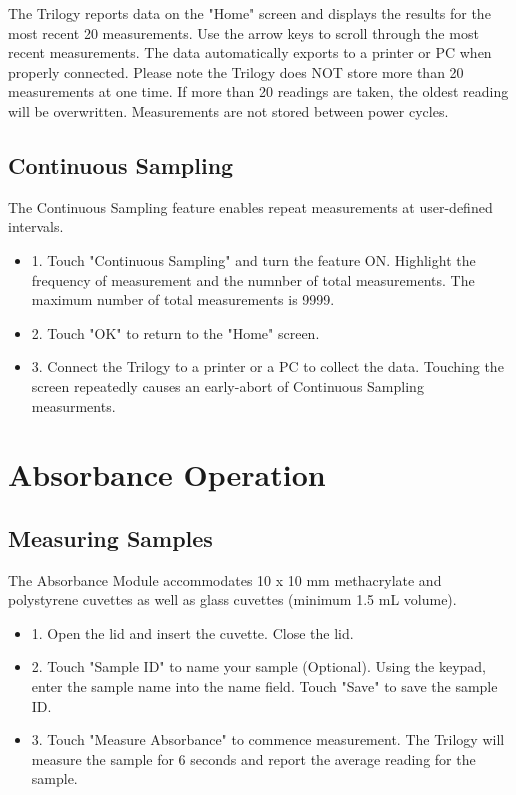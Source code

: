 \documentclass[12pt]{../SOP3_beta}\usepackage[]{graphicx}\usepackage[]{color}
\begin{document}
\NP The Trilogy reports data on the "Home" screen and displays the results for the most recent 20 measurements. Use the arrow keys to scroll through the most recent measurements. The data automatically exports to a printer or PC when properly connected. Please note the Trilogy does NOT store more than 20 measurements at one time. If more than 20 readings are taken, the oldest reading will be overwritten. Measurements are not stored between power cycles. 

\subsection{Continuous Sampling}
\NP The Continuous Sampling feature enables repeat measurements at user-defined intervals.
\begin{itemize}
  \item 1. Touch "Continuous Sampling" and turn the feature ON. Highlight the frequency of measurement and the numnber of total measurements. The maximum number of total measurements is 9999.
  \item 2. Touch "OK" to return to the "Home" screen.
  \item 3. Connect the Trilogy to a printer or a PC to collect the data. Touching the screen repeatedly causes an early-abort of Continuous Sampling measurments. 
\end{itemize}

\section{Absorbance Operation}
\subsection{Measuring Samples}
\NP The Absorbance Module accommodates 10 x 10 mm methacrylate and polystyrene cuvettes as well as glass cuvettes (minimum 1.5 mL volume).
\begin{itemize}
  \item 1. Open the lid and insert the cuvette. Close the lid.
  \item 2. Touch "Sample ID" to name your sample (Optional). Using the keypad, enter the sample name into the name field. Touch "Save" to save the sample ID. 
  \item 3. Touch "Measure Absorbance" to commence measurement. The Trilogy will measure the sample for 6 seconds and report the average reading for the sample. 
\end{itemize}
\end{document}
